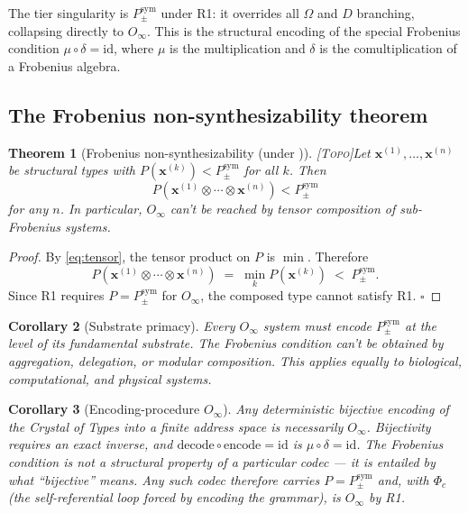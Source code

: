 \documentclass[12pt,a4paper]{article}
\newtheorem{theorem}{Theorem}
\newtheorem{corollary}[theorem]{Corollary}
\newcommand{\xvec}{\mathbf{x}}
\newcommand{\Phic}{\Phi_c}
\newcommand{\Ppms}{P_{\pm}^{\text{sym}}}
\newcommand{\Oinf}{O_\infty}
\newcommand{\tensor}{\otimes}
\newcommand{\TOPO}{\textsc{[Topo]}}
\begin{document}
\noindent
The tier singularity is $\Ppms$ under R1: it overrides all $\Omega$
and $D$ branching, collapsing directly to $\Oinf$. This is the
structural encoding of the special Frobenius condition $\mu \circ
\delta = \text{id}$, where $\mu$ is the multiplication and $\delta$
is the comultiplication of a Frobenius algebra.

\subsection{The Frobenius non-synthesizability theorem}

\begin{theorem}[Frobenius non-synthesizability (under )]
\label{thm:frobenius}
\TOPO\quad Let $\xvec^{(1)}, \ldots, \xvec^{(n)}$ be structural types
with $P(\xvec^{(k)}) < \Ppms$ for all $k$. Then
\begin{equation}
  P\!\left(\xvec^{(1)} \tensor \cdots \tensor \xvec^{(n)}\right) < \Ppms
  \label{eq:non_synth}
\end{equation}
for any $n$. In particular, $\Oinf$ can't be reached by tensor
composition of sub-Frobenius systems.
\end{theorem}

\begin{proof}
By \eqref{eq:tensor}, the tensor product on $P$ is $\min$. Therefore
\[
  P\!\left(\xvec^{(1)} \tensor \cdots \tensor \xvec^{(n)}\right)
  \;=\; \min_k P(\xvec^{(k)}) \;<\; \Ppms.
\]
Since R1 requires $P = \Ppms$ for $\Oinf$, the composed type cannot
satisfy R1. \qquad$\square$
\end{proof}

\begin{corollary}[Substrate primacy]
\label{cor:substrate}
Every $\Oinf$ system must encode $\Ppms$ at the level of its
fundamental substrate. The Frobenius condition can't be obtained by
aggregation, delegation, or modular composition. This applies equally
to biological, computational, and physical systems.
\end{corollary}

\begin{corollary}[Encoding-procedure $\Oinf$]
\label{cor:codec_oinf}
Any deterministic bijective encoding of the Crystal of Types into a
finite address space is necessarily $\Oinf$. Bijectivity requires an
exact inverse, and $\mathrm{decode} \circ \mathrm{encode} = \mathrm{id}$
is $\mu \circ \delta = \mathrm{id}$. The Frobenius condition is not a
structural property of a particular codec --- it is entailed by
what ``bijective'' means. Any such codec therefore carries
$P = \Ppms$ and, with $\Phic$ (the self-referential loop forced by
encoding the grammar), is $\Oinf$ by R1.
\end{corollary}
\end{document}
